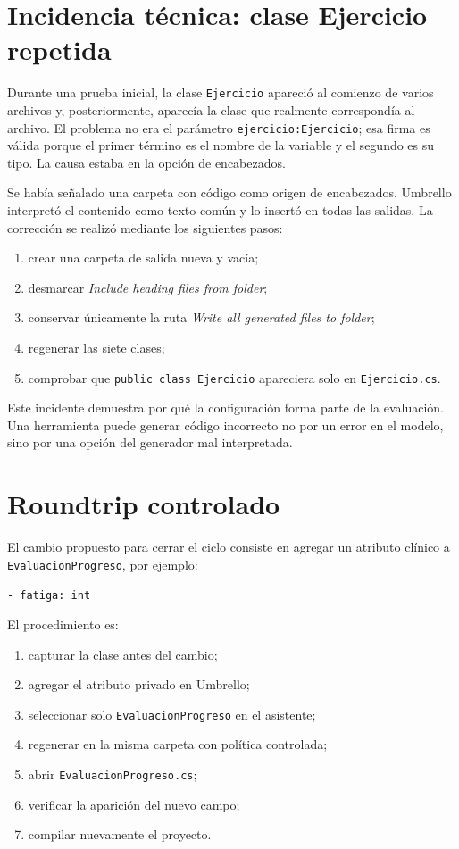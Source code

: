 \section{Incidencia técnica: clase Ejercicio repetida}
Durante una prueba inicial, la clase \texttt{Ejercicio} apareció al comienzo de varios archivos y, posteriormente, aparecía la clase que realmente correspondía al archivo. El problema no era el parámetro \texttt{ejercicio:Ejercicio}; esa firma es válida porque el primer término es el nombre de la variable y el segundo es su tipo. La causa estaba en la opción de encabezados.

Se había señalado una carpeta con código como origen de encabezados. Umbrello interpretó el contenido como texto común y lo insertó en todas las salidas. La corrección se realizó mediante los siguientes pasos:
\begin{enumerate}
  \item crear una carpeta de salida nueva y vacía;
  \item desmarcar \textit{Include heading files from folder};
  \item conservar únicamente la ruta \textit{Write all generated files to folder};
  \item regenerar las siete clases;
  \item comprobar que \texttt{public class Ejercicio} apareciera solo en \texttt{Ejercicio.cs}.
\end{enumerate}

Este incidente demuestra por qué la configuración forma parte de la evaluación. Una herramienta puede generar código incorrecto no por un error en el modelo, sino por una opción del generador mal interpretada.

\section{Roundtrip controlado}
El cambio propuesto para cerrar el ciclo consiste en agregar un atributo clínico a \texttt{EvaluacionProgreso}, por ejemplo:
\begin{center}
\texttt{- fatiga: int}
\end{center}

El procedimiento es:
\begin{enumerate}
  \item capturar la clase antes del cambio;
  \item agregar el atributo privado en Umbrello;
  \item seleccionar solo \texttt{EvaluacionProgreso} en el asistente;
  \item regenerar en la misma carpeta con política controlada;
  \item abrir \texttt{EvaluacionProgreso.cs};
  \item verificar la aparición del nuevo campo;
  \item compilar nuevamente el proyecto.
\end{enumerate}

